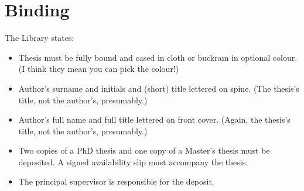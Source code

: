 \chapter{Binding}\label{C:bin}

The Library states:
\begin{itemize}
\item Thesis must be fully bound and cased in cloth or buckram in optional colour. (I think they mean you can pick the colour!)
\item Author's surname and initials and (short) title lettered on spine. (The thesis's title, not the author's, presumably.)
\item Author's full name and full title lettered on front cover. (Again, the thesis's title, not the author's, presumably.)
\item Two copies of a PhD thesis and one copy of a Master's thesis must be deposited. A signed availability slip must accompany the thesis.
\item  The principal supervisor is responsible for the deposit.
\end{itemize}